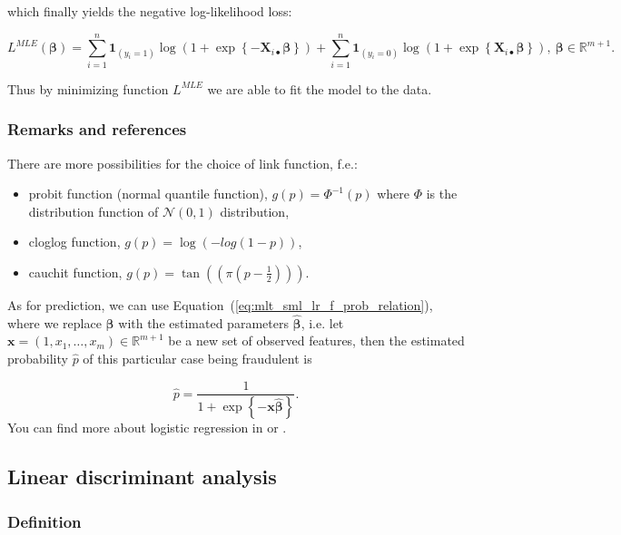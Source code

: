 \documentclass[12pt, a4paper]{report}
\newcommand{\R}{\mathbb{R}}
\theoremstyle{plain}
\theoremstyle{plain}
\theoremstyle{remark}
\begin{document}
which finally yields the negative log-likelihood loss:

$$
L^{MLE}(\pmb{\beta}) = \sum_{i=1}^n \textbf{1}_{(y_i=1)}\log\left(1+\exp\left\{-\pmb{X}_{i\bullet}\pmb{\beta}\right\}\right) + \sum_{i=1}^n \textbf{1}_{(y_i=0)}\log\left(1+\exp\left\{\pmb{X}_{i\bullet}\pmb{\beta}\right\}\right),\ \pmb{\beta}\in\R^{m+1}.
$$

Thus by minimizing function $L^{MLE}$ we are able to fit the model to the data.

\subsubsection{Remarks and references}
\label{subsubsec:mlt_sml_lr_remarks_and_references}

There are more possibilities for the choice of link function, f.e.:
\begin{itemize}
\item probit function (normal quantile function), $g(p) = \Phi^{-1}(p)$ where $\Phi$ is the distribution function of $\mathcal{N}(0,1)$ distribution,
\item cloglog function, $g(p) = \log(-log(1-p))$,
\item cauchit function, $g(p) = \tan\left(\left(\pi\left(p-\frac{1}{2}\right)\right)\right)$.
\end{itemize}

As for prediction, we can use Equation~(\ref{eq:mlt_sml_lr_f_prob_relation}), where we replace $\pmb{\beta}$ with the estimated parameters $\hat{\pmb{\beta}}$, i.e. let $\pmb{x}=(1,x_1,\ldots,x_m)\in\R^{m+1}$ be a new set of observed features, then the estimated probability $\hat{p}$ of this particular case being fraudulent is

\begin{equation}
\label{eq:mlt_sml_lr_f_prediction}
\hat{p} = \frac{1}{1+\exp\left\{-\pmb{x}\hat{\pmb{\beta}}\right\}}.
\end{equation}
You can find more about logistic regression in \citep{basicRef} or \citep{logReg}.

\subsection{Linear discriminant analysis}
\label{subsec:mlt_sml_linear_discriminant_analysis}

\subsubsection{Definition}
\label{subsubsec:mlt_sml_lda_definition}
\end{document}
